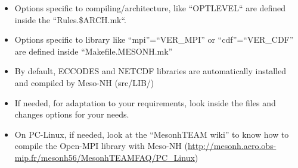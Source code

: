 \begin{itemize}
\item Options specific to compiling/architecture, like ``OPTLEVEL`` are defined inside the ``Rules.\${ARCH}.mk``.
\item Options specific to library like ``mpi''=``VER\_MPI'' or ``cdf''=``VER\_CDF'' are defined inside ``Makefile.MESONH.mk''
\item By default, ECCODES and NETCDF libraries are automatically installed and compiled by Meso-NH (src/LIB/)
\item If needed, for adaptation to your requirements, look inside the files and changes options for your needs.
\item On PC-Linux, if needed, look at the ``MesonhTEAM wiki'' to know how to compile the Open-MPI library with Meso-NH (\href{http://mesonh.aero.obs-mip.fr/mesonh56/MesonhTEAMFAQ/PC_Linux}{http://mesonh.aero.obs-mip.fr/mesonh56/MesonhTEAMFAQ/PC\_Linux})
 \end{itemize}

 
